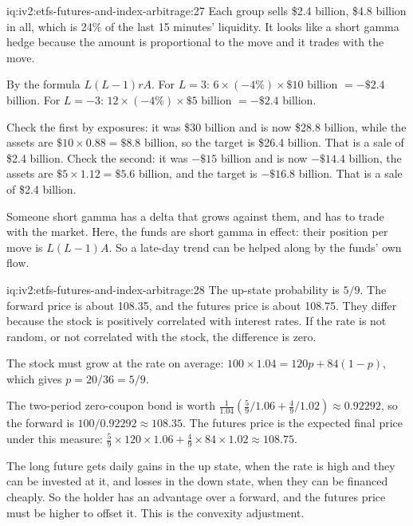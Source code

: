 \begin{solution}{iq:iv2:etfs-futures-and-index-arbitrage:27}
Each group sells \$2.4 billion, \$4.8 billion in all, which is 24\% of the last 15 minutes' liquidity. It looks like a short gamma hedge because the amount is proportional to the move and it trades with the move.

By the formula $L(L - 1)rA$. For $L = 3$: $6 \times (-4\%) \times \$10$ billion $= -\$2.4$ billion. For $L = -3$: $12 \times (-4\%) \times \$5$ billion $= -\$2.4$ billion.

Check the first by exposures: it was \$30 billion and is now \$28.8 billion, while the assets are $\$10 \times 0.88 = \$8.8$ billion, so the target is \$26.4 billion. That is a sale of \$2.4 billion. Check the second: it was $-\$15$ billion and is now $-\$14.4$ billion, the assets are $\$5 \times 1.12 = \$5.6$ billion, and the target is $-\$16.8$ billion. That is a sale of \$2.4 billion.

Someone short gamma has a delta that grows against them, and has to trade with the market. Here, the funds are short gamma in effect: their position per move is $L(L - 1)A$. So a late-day trend can be helped along by the funds' own flow.

\end{solution}

\begin{solution}{iq:iv2:etfs-futures-and-index-arbitrage:28}
The up-state probability is $5/9$. The forward price is about 108.35, and the futures price is about 108.75. They differ because the stock is positively correlated with interest rates. If the rate is not random, or not correlated with the stock, the difference is zero.

The stock must grow at the rate on average: $100 \times 1.04 = 120p + 84(1 - p)$, which gives $p = 20/36 = 5/9$.

The two-period zero-coupon bond is worth $\tfrac{1}{1.04}\left(\tfrac59/1.06 + \tfrac49/1.02\right) \approx 0.92292$, so the forward is $100/0.92292 \approx 108.35$. The futures price is the expected final price under this measure: $\tfrac59 \times 120 \times 1.06 + \tfrac49 \times 84 \times 1.02 \approx 108.75$.

The long future gets daily gains in the up state, when the rate is high and they can be invested at it, and losses in the down state, when they can be financed cheaply. So the holder has an advantage over a forward, and the futures price must be higher to offset it. This is the convexity adjustment.

\end{solution}

